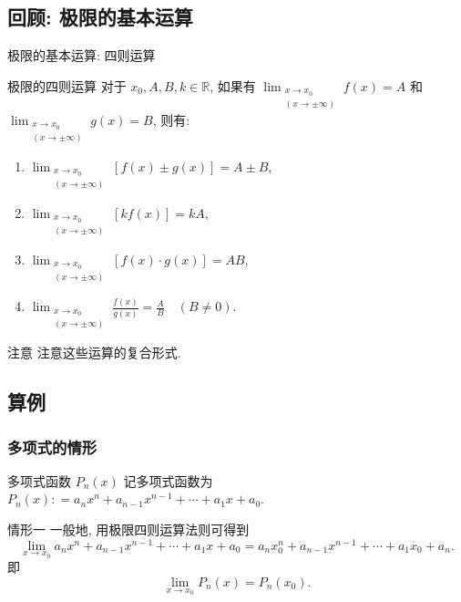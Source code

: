 \documentclass[
10pt,  
aspectratio=43,  
]{beamer}
\begin{document}
\subsection{回顾: 极限的基本运算}
\begin{frame}[c]{极限的基本运算: 四则运算}
	\begin{block}{极限的四则运算}
		对于 $x_0,  A,  B,  k \in \mathbb{R}$,  如果有 $\lim _{\substack{x \rightarrow x_0 \\(x \rightarrow \pm\infty)}} f(x)=A$ 和 $ \lim _{\substack{x \rightarrow x_0 \\(x \rightarrow \pm\infty)}} g(x)=B$,   则有: 
		\pause
		
		\begin{enumerate}
			\item $\lim _{\substack{x \rightarrow x_0 \\(x \rightarrow \pm\infty)}}[f(x) \pm g(x)]=A \pm B$,  \\
			      \pause
			\item
			      $\lim _{\substack{x \rightarrow x_0 \\(x \rightarrow \pm\infty)}}[k f(x)]=k A$,  \\
			      \pause
			\item $\lim _{\substack{x \rightarrow x_0 \\(x \rightarrow\pm \infty)}}[f(x) \cdot g(x)]=A B$,  \\
			      \pause
			\item $\lim _{\substack{x \rightarrow x_0 \\(x \rightarrow\pm \infty)}} \displaystyle\frac{f(x)}{g(x)}=\frac{A}{B} \quad(B \neq 0)$.
		\end{enumerate}
	\end{block}
	\begin{exampleblock}{注意}
		注意这些运算的复合形式.
	\end{exampleblock}
\end{frame}

\subsection{算例}
\begin{frame}
	\frametitle{多项式的情形}
	\begin{block}{多项式函数 $P_n(x)$}
		记多项式函数为 $P_n(x) : = a_n x^n+a_{n-1} x^{n-1}+\cdots+a_{1} x+a_0$.
	\end{block}
	\begin{exampleblock}{情形一}
		一般地,   用极限四则运算法则可得到
		$$
		\lim _{x \rightarrow x_0}a_n x^n+a_{n-1} x^{n-1}+\cdots+a_{1} x+a_0=a_n x_0^n+a_{n-1} x^{n-1}+\cdots+a_{1} x_0+a_n.
		$$
		即
		$$
		\lim _{x \rightarrow x_0}P_n(x)=P_n(x_0).
		$$
	\end{exampleblock}
	
\end{frame}
\end{document}
